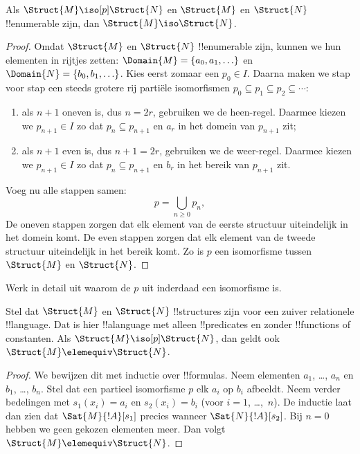 \documentclass[../../../include/open-logic-section]{subfiles}
\begin{document}
\begin{thm}
  Als $\Struct{M} \iso[p] \Struct{N}$ en $\Struct{M}$ en
  $\Struct{N}$ !!{enumerable} zijn, dan $\Struct{M} \iso
  \Struct{N}$.
\end{thm}

\begin{proof}
  Omdat $\Struct{M}$ en $\Struct{N}$ !!{enumerable} zijn, kunnen we hun
  elementen in rijtjes zetten:
  $\Domain{M} = \{a_0, a_1, \ldots \}$ en
  $\Domain{N} = \{b_0, b_1, \ldots \}$. Kies eerst zomaar een
  $p_0 \in I$. Daarna maken we stap voor stap een steeds grotere rij
  partiële isomorfismen
  $p_0 \subseteq p_1 \subseteq p_2 \subseteq \cdots$:
  \begin{enumerate}
  \item als $n+1$ oneven is, dus $n = 2r$, gebruiken we de
    heen-regel. Daarmee kiezen we $p_{n+1} \in I$ zo dat
    $p_n \subseteq p_{n+1}$ en $a_r$ in het domein van $p_{n+1}$ zit;
  \item als $n+1$ even is, dus $n+1 =2r$, gebruiken we de
    weer-regel. Daarmee kiezen we $p_{n+1} \in I$ zo dat
    $p_n \subseteq p_{n+1}$ en $b_r$ in het bereik van $p_{n+1}$ zit.
  \end{enumerate}
Voeg nu alle stappen samen:
\[
p = \bigcup_{n\ge 0} p_n,
\]
De oneven stappen zorgen dat elk element van de eerste structuur uiteindelijk
in het domein komt. De even stappen zorgen dat elk element van de tweede
structuur uiteindelijk in het bereik komt. Zo is $p$ een
isomorfisme tussen $\Struct{M}$ en $\Struct{N}$.
\end{proof}

\begin{prob}
  Werk in detail uit waarom de $p$ uit
   inderdaad een isomorfisme is.
\end{prob}

\begin{thm}
  Stel dat $\Struct{M}$ en $\Struct{N}$ !!{structure}s zijn voor een
  zuiver relationele !!{language}. Dat is hier !!a{language} met
  alleen !!{predicate}s en zonder !!{function}s of constanten. Als
  $\Struct{M} \iso[p] \Struct{N}$, dan geldt ook
  $\Struct{M} \elemequiv \Struct{N}$.
\end{thm}

\begin{proof}
  We bewijzen dit met inductie over !!{formula}s. Neem elementen
  $a_1$, \dots, $a_n$ en $b_1$, \dots, $b_n$. Stel dat een partieel
  isomorfisme $p$ elk $a_i$ op $b_i$ afbeeldt. Neem verder bedelingen
  met $s_1(x_i) =a_i$ en $s_2(x_i) =b_i$ (voor
  $i =1$, \dots,~$n$). De inductie laat dan zien dat
  $\Sat{M}{!A}[s_1]$ precies wanneer $\Sat{N}{!A}[s_2]$. Bij $n=0$
  hebben we geen gekozen elementen meer. Dan volgt
  $\Struct{M} \elemequiv \Struct{N}$.
\end{proof}
\end{document}
